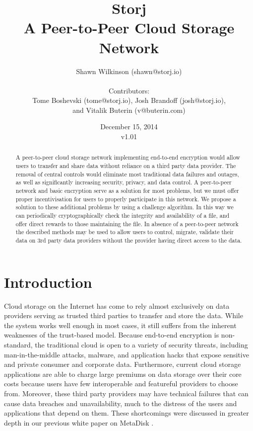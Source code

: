 \documentclass[a4paper,10pt]{article}
\title{\textbf{Storj\\A Peer-to-Peer Cloud Storage Network}}
\author{Shawn Wilkinson (shawn@storj.io)\\
\\Contributors:\\ 
Tome Boshevski (tome@storj.io), Josh Brandoff (josh@storj.io),\\ 
and Vitalik Buterin (v@buterin.com)}
\date {December 15, 2014 \\ v1.01}
\begin{document}
\maketitle
\begin{abstract}
A peer-to-peer cloud storage network implementing end-to-end encryption would allow users to transfer and share data without reliance on a third party data provider. The removal of central controls would eliminate most traditional data failures and outages, as well as significantly increasing security, privacy, and data control. A peer-to-peer network and basic encryption serve as a solution for most problems, but we must offer proper incentivisation for users to properly participate in this network. We propose a solution to these additional problems by using a challenge algorithm. In this way we can periodically cryptographically check the integrity and availability of a file, and offer direct rewards to those maintaining the file. In absence of a peer-to-peer network the described methods may be used to allow users to control, migrate, validate their data on 3rd party data providers without the provider having direct access to the data. 
\end{abstract}

\section{Introduction}
Cloud storage on the Internet has come to rely almost exclusively on data providers serving as trusted third parties to transfer and store the data. While the system works well enough in most cases, it still suffers from the inherent weaknesses of the trust-based model. Because end-to-end encryption is non-standard, the traditional cloud is open to a variety of security threats, including man-in-the-middle attacks, malware, and application hacks that expose sensitive and private consumer and corporate data. Furthermore, current cloud storage applications are able to charge large premiums on data storage over their core costs because users have few interoperable and featureful providers to choose from. Moreover, these third party providers may have technical failures that can cause data breaches and unavailability, much to the distress of the users and applications that depend on them. These shortcomings were discussed in greater depth in our previous white paper on MetaDisk \cite{1}.\\
\end{document}

